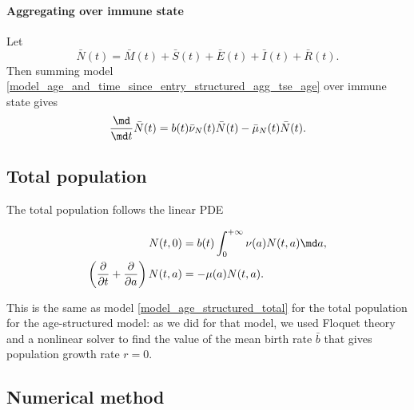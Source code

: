\documentclass{jpmarticle}
\let\subequationsorig\subequations%
\let\endsubequationsorig\endsubequations%
\renewenvironment{subequations}{
  \subequationsorig
  \renewcommand{\theequation}{\theparentequation.\arabic{equation}}
}{
  \endsubequationsorig
}
\begin{document}
\paragraph{Aggregating over immune state}

Let
\begin{equation}
  \bar{N}(t)
  = \bar{M}(t) + \bar{S}(t) + \bar{E}(t)
  + \bar{I}(t) + \bar{R}(t).
\end{equation}
Then summing model
\eqref{model_age_and_time_since_entry_structured_agg_tse_age} over
immune state gives
\begin{equation}
  \label{model_age_and_time_since_entry_structured_agg_tse_age_state}
  \frac{\md}{\md t} \bar{N}(t)
  = b(t) \bar{\nu}_N(t) \bar{N}(t)
  - \bar{\mu}_N(t) \bar{N}(t).
\end{equation}


\subsection{Total population}

The total population follows the linear PDE
\begin{subequations}
  \begin{align}
    N(t, 0) &=
    b(t) \int_0^{+\infty} \nu(a) N(t, a) \md a,
    \\
    \left(\frac{\partial}{\partial t}
      + \frac{\partial}{\partial a}\right)
    N(t, a) &=
    - \mu(a) N(t, a).
  \end{align}
\end{subequations}
This is the same as model \eqref{model_age_structured_total} for the
total population for the age-structured model: as we did for that
model, we used Floquet theory and a nonlinear solver to find the value
of the mean birth rate $\bar{b}$ that gives population growth rate
$r = 0$.


\subsection{Numerical method}
\end{document}
